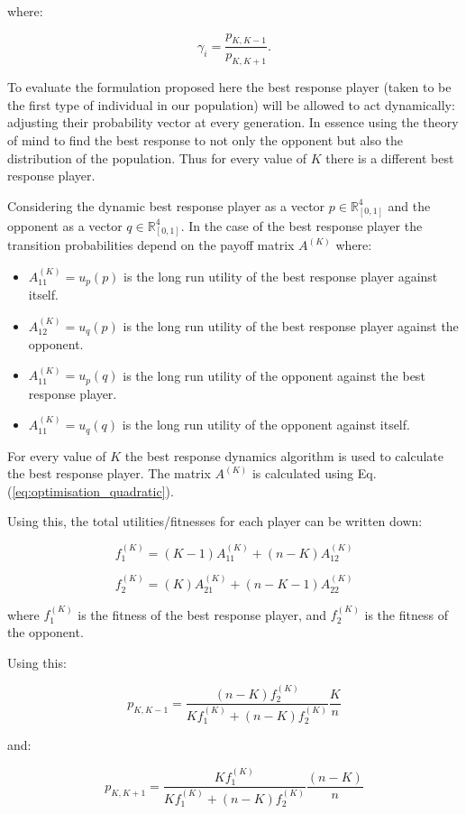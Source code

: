 \documentclass[10pt]{article}
\begin{document}
where:

\[ \gamma_i = \frac{ p_{K, K - 1} }{ p_{K, K + 1} }. \]

To evaluate the formulation proposed here the best response player (taken to be
the first type of individual in our population)  will be allowed to act
dynamically: adjusting their probability vector at every generation. In essence
using the theory of mind to find the best response to not only the opponent but
also the distribution of the population.  Thus for every value of \(K\) there is
a different best response player.

Considering the dynamic best response player as a vector
\(p\in\mathbb{R}^4_{[0, 1]}\) and the opponent as a vector
\(q\in\mathbb{R}^4_{[0, 1]}\).
In the case of the best response player the transition probabilities depend on
the payoff matrix \(A ^ {(K)}\) where:

\begin{itemize}
    \item \(A ^ {(K)}_{11}=u_{p}(p)\) is the long run utility of the best response player against itself.
    \item \(A ^ {(K)}_{12}=u_{q}(p)\) is the long run utility of the best response player against the opponent.
    \item \(A ^ {(K)}_{11}=u_{p}(q)\) is the long run utility of the opponent against the best response player.
    \item \(A ^ {(K)}_{11}=u_{q}(q)\) is the long run utility of the opponent against itself.
\end{itemize}

For every value of \(K\) the best response dynamics algorithm is used to
calculate the best response player.
The matrix \(A ^ {(K)}\) is calculated using Eq.
(\ref{eq:optimisation_quadratic}).

Using this, the total utilities/fitnesses for each player can be written down:

\[f_1^{(K)} = (K - 1) A_{11}^{(K)} + (n - K)A_{12}^{(K)}\]

\[f_2^{(K)} = (K) A_{21}^{(K)} + (n - K - 1)A_{22}^{(K)}\]

where \(f_1^{(K)}\) is the fitness of the best response player, and \(f_2^{(K)}\) is
the fitness of the opponent.

Using this:

\[ p_{K, K - 1} = \frac{ (n - K)f_2^{(K)} }{ Kf_1^{(K)}+(n - K)f_2^{(K)} } \frac{ K }{ n } \]

and:

\[ p_{K, K + 1} = \frac{ Kf_1^{(K)} }{ Kf_1^{(K)}+(n - K)f_2^{(K)} } \frac{ (n - K) }{ n } \]
\end{document}
